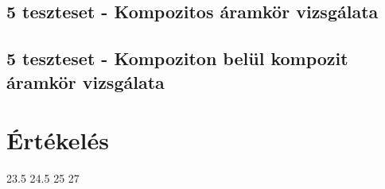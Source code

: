 \subsection{5 teszteset - Kompozitos áramkör vizsgálata}

\subsection{5 teszteset - Kompoziton belül kompozit áramkör vizsgálata}












\section{Értékelés}

\begin{ertekeles}
{23.5}        %
{24.5}
{25}
{27}
\end{ertekeles}

